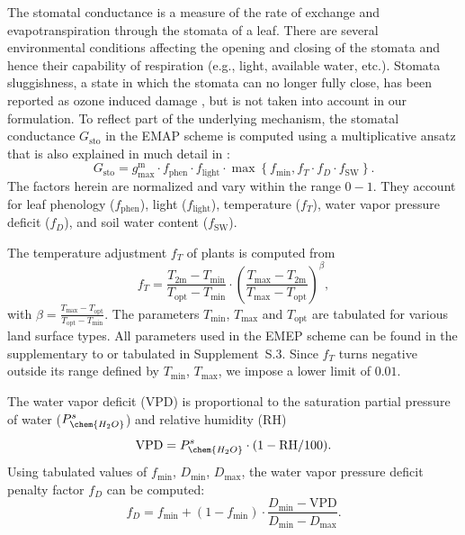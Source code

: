 \documentclass[gmd, manuscript]{copernicus}
\begin{document}
The stomatal conductance is a measure of the rate of  exchange and evapotranspiration through the stomata of a leaf. There are several environmental conditions affecting the opening and closing of the stomata and hence their capability of respiration (e.g., light, available water, etc.). Stomata sluggishness, a state in which the stomata can no longer fully close, has been reported as ozone induced damage \citep{SR:Hoshika2015}, but is not taken into account in our formulation. To reflect part of the underlying mechanism, the stomatal conductance $G_\text{sto}$ in the EMAP scheme is computed using a multiplicative ansatz that is also explained in much detail in \citet{ICP:MappingManual2017}:
%
\begin{equation}
  G_\text{sto} = g^\text{m}_\text{max} \cdot f_\text{phen} \cdot f_\text{light} \cdot \max{\left\{f_\text{min}, f_T \cdot f_D \cdot f_\text{SW}\right\}}.
  \label{eq:stomatal}
\end{equation}
%
The factors herein are normalized and vary within the range $0-1$. They account for leaf phenology ($f_\text{phen}$), light ($f_\text{light}$), temperature ($f_T$), water vapor pressure deficit ($f_D$), and soil water content ($f_\text{SW}$).

The temperature adjustment $f_T$ of plants is computed from
%
\begin{equation}
  f_T = \frac{T_\text{2m}-T_\text{min}}{T_\text{opt}-T_\text{min}} \cdot \left(\frac{T_{\text{max}}-T_\text{2m}}{T_{\text{max}}-T_\text{opt}}\right)^\beta, 
\end{equation}
with $\beta = \frac{T_\text{max}-T_\text{opt}}{T_\text{opt}-T_\text{min}}$. The parameters $T_\text{min}$, $T_\text{max}$ and $T_\text{opt}$ are tabulated for various land surface types. All parameters used in the EMEP scheme can be found in the supplementary to \citet{ACP:Simpson2012} or tabulated in Supplement~S.3. Since $f_T$ turns negative outside its range defined by $T_\text{min}$, $T_\text{max}$, we impose a lower limit of $0.01$.

The water vapor deficit (VPD) is proportional to the saturation partial pressure of water ($P_\chem{H_2O}^s$) and relative humidity ($\text{RH}$)
%
\begin{equation}
  \text{VPD} = P_\chem{H_2O}^s \cdot (1 - \text{RH}/100).
\end{equation}
%
Using tabulated values of $f_\text{min}$, $D_\text{min}$, $D_\text{max}$, the water vapor pressure deficit penalty factor $f_D$ can be computed:
%
\begin{equation}
  f_D = f_\text{min}+(1-f_\text{min}) \cdot \frac{D_\text{min} - \text{VPD}}{D_\text{min}-D_\text{max}}.
\end{equation}
\end{document}
